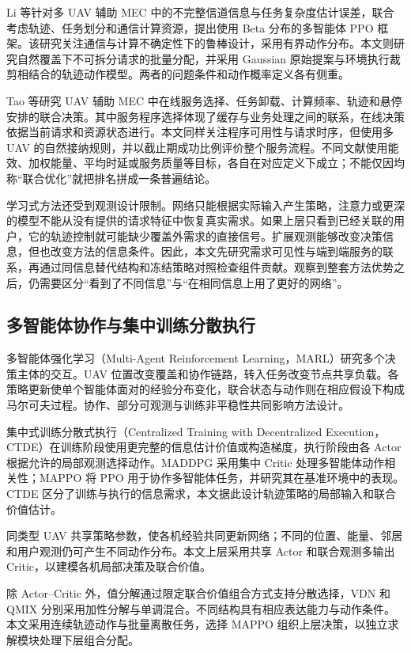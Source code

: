 Li 等针对多 UAV 辅助 MEC 中的不完整信道信息与任务复杂度估计误差，联合考虑轨迹、任务划分和通信计算资源，提出使用 Beta 分布的多智能体 PPO 框架\cite{zhao2024robust}。该研究关注通信与计算不确定性下的鲁棒设计，采用有界动作分布。本文则研究自然覆盖下不可拆分请求的批量分配，并采用 Gaussian 原始提案与环境执行裁剪相结合的轨迹动作模型。两者的问题条件和动作概率定义各有侧重。

Tao 等研究 UAV 辅助 MEC 中在线服务选择、任务卸载、计算频率、轨迹和悬停安排的联合决策\cite{tao2026online}。其中服务程序选择体现了缓存与业务处理之间的联系，在线决策依据当前请求和资源状态进行。本文同样关注程序可用性与请求时序，但使用多 UAV 的自然接纳规则，并以截止期成功比例评价整个服务流程。不同文献使用能效、加权能量、平均时延或服务质量等目标，各自在对应定义下成立；不能仅因均称“联合优化”就把排名拼成一条普遍结论。

学习式方法还受到观测设计限制。网络只能根据实际输入产生策略，注意力或更深的模型不能从没有提供的请求特征中恢复真实需求。如果上层只看到已经关联的用户，它的轨迹控制就可能缺少覆盖外需求的直接信号。扩展观测能够改变决策信息，但也改变方法的信息条件。因此，本文先研究需求可见性与端到端服务的联系，再通过同信息替代结构和冻结策略对照检查组件贡献。观察到整套方法优势之后，仍需要区分“看到了不同信息”与“在相同信息上用了更好的网络”。

\subsection{多智能体协作与集中训练分散执行}
\label{sec:ch1-marl-related}

多智能体强化学习（Multi-Agent Reinforcement Learning，MARL）研究多个决策主体的交互。UAV 位置改变覆盖和协作链路，转入任务改变节点共享负载。各策略更新使单个智能体面对的经验分布变化，联合状态与动作则在相应假设下构成马尔可夫过程。协作、部分可观测与训练非平稳性共同影响方法设计。

集中式训练分散式执行（Centralized Training with Decentralized Execution，CTDE）在训练阶段使用更完整的信息估计价值或构造梯度，执行阶段由各 Actor 根据允许的局部观测选择动作。MADDPG 采用集中 Critic 处理多智能体动作相关性\cite{lowe2017multi}；MAPPO 将 PPO 用于协作多智能体任务，并研究其在基准环境中的表现\cite{yu2022surprising}。CTDE 区分了训练与执行的信息需求，本文据此设计轨迹策略的局部输入和联合价值估计。

同类型 UAV 共享策略参数，使各机经验共同更新网络；不同的位置、能量、邻居和用户观测仍可产生不同动作分布。本文上层采用共享 Actor 和联合观测多输出 Critic，以建模各机局部决策及联合价值。

除 Actor--Critic 外，值分解通过限定联合价值组合方式支持分散选择，VDN 和 QMIX 分别采用加性分解与单调混合\cite{sunehag2018value,rashid2018qmix}。不同结构具有相应表达能力与动作条件。本文采用连续轨迹动作与批量离散任务，选择 MAPPO 组织上层决策，以独立求解模块处理下层组合分配。

